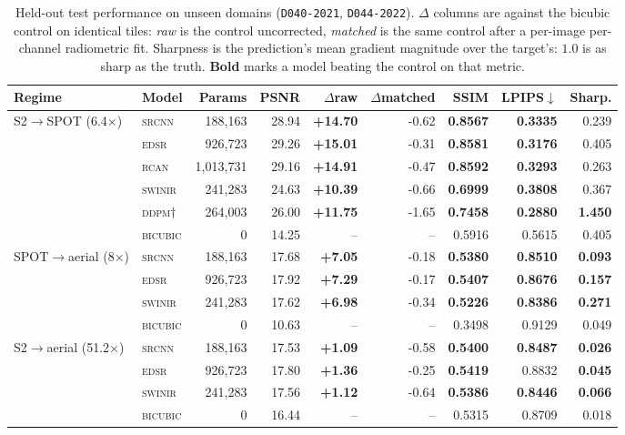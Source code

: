 \begin{table}[t]\centering\footnotesize
\caption{Held-out test performance on unseen domains (\texttt{D040-2021}, \texttt{D044-2022}). $\Delta$ columns are against the bicubic control on identical tiles: \emph{raw} is the control uncorrected, \emph{matched} is the same control after a per-image per-channel radiometric fit. Sharpness is the prediction's mean gradient magnitude over the target's: $1.0$ is as sharp as the truth. \textbf{Bold} marks a model beating the control on that metric. }
\label{tab:main}
\setlength{\tabcolsep}{3pt}
\begin{tabular}{@{}llrrrrrrr@{}}\toprule
Regime & Model & Params & PSNR & $\Delta$raw & $\Delta$matched & SSIM & LPIPS$\downarrow$ & Sharp.\\\midrule
S2$\rightarrow$SPOT (6.4$\times$) & \textsc{srcnn} & 188,163 & 28.94 & \textbf{+14.70} & -0.62 & \textbf{0.8567} & \textbf{0.3335} & 0.239\\
 & \textsc{edsr} & 926,723 & 29.26 & \textbf{+15.01} & -0.31 & \textbf{0.8581} & \textbf{0.3176} & 0.405\\
 & \textsc{rcan} & 1,013,731 & 29.16 & \textbf{+14.91} & -0.47 & \textbf{0.8592} & \textbf{0.3293} & 0.263\\
 & \textsc{swinir} & 241,283 & 24.63 & \textbf{+10.39} & -0.66 & \textbf{0.6999} & \textbf{0.3808} & 0.367\\
 & \textsc{ddpm}$\dagger$ & 264,003 & 26.00 & \textbf{+11.75} & -1.65 & \textbf{0.7458} & \textbf{0.2880} & \textbf{1.450}\\
 & \textsc{bicubic} & 0 & 14.25 & -- & -- & 0.5916 & 0.5615 & 0.405\\
\midrule
SPOT$\rightarrow$aerial (8$\times$) & \textsc{srcnn} & 188,163 & 17.68 & \textbf{+7.05} & -0.18 & \textbf{0.5380} & \textbf{0.8510} & \textbf{0.093}\\
 & \textsc{edsr} & 926,723 & 17.92 & \textbf{+7.29} & -0.17 & \textbf{0.5407} & \textbf{0.8676} & \textbf{0.157}\\
 & \textsc{swinir} & 241,283 & 17.62 & \textbf{+6.98} & -0.34 & \textbf{0.5226} & \textbf{0.8386} & \textbf{0.271}\\
 & \textsc{bicubic} & 0 & 10.63 & -- & -- & 0.3498 & 0.9129 & 0.049\\
\midrule
S2$\rightarrow$aerial (51.2$\times$) & \textsc{srcnn} & 188,163 & 17.53 & \textbf{+1.09} & -0.58 & \textbf{0.5400} & \textbf{0.8487} & \textbf{0.026}\\
 & \textsc{edsr} & 926,723 & 17.80 & \textbf{+1.36} & -0.25 & \textbf{0.5419} & 0.8832 & \textbf{0.045}\\
 & \textsc{swinir} & 241,283 & 17.56 & \textbf{+1.12} & -0.64 & \textbf{0.5386} & \textbf{0.8446} & \textbf{0.066}\\
 & \textsc{bicubic} & 0 & 16.44 & -- & -- & 0.5315 & 0.8709 & 0.018\\
\bottomrule\end{tabular}\end{table}